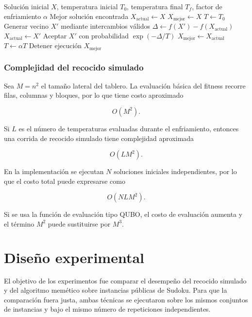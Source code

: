 \documentclass{article}
\begin{document}
\begin{algorithm}[H]
\caption{Recocido simulado}
\begin{algorithmic}[1]
\Require Solución inicial \(X\), temperatura inicial \(T_0\), temperatura final \(T_f\), factor de enfriamiento \(\alpha\)
\Ensure Mejor solución encontrada
\State \(X_{\text{actual}} \gets X\)
\State \(X_{\text{mejor}} \gets X\)
\State \(T \gets T_0\)
    \State Generar vecino \(X'\) mediante intercambios válidos
    \State \(\Delta \gets f(X') - f(X_{\text{actual}})\)
        \State \(X_{\text{actual}} \gets X'\)
    \Else
        \State Aceptar \(X'\) con probabilidad \(\exp(-\Delta/T)\)
    \EndIf
        \State \(X_{\text{mejor}} \gets X_{\text{actual}}\)
    \EndIf
    \State \(T \gets \alpha T\)
        \State Detener ejecución
    \EndIf
\EndWhile
\State \Return \(X_{\text{mejor}}\)
\end{algorithmic}
\end{algorithm}

\subsubsection{Complejidad del recocido simulado}

Sea \(M=n^2\) el tamaño lateral del tablero. La evaluación básica del fitness recorre filas, columnas y bloques, por lo que tiene costo aproximado

\[
O(M^2).
\]

Si \(L\) es el número de temperaturas evaluadas durante el enfriamiento, entonces una corrida de recocido simulado tiene complejidad aproximada

\[
O(LM^2).
\]

En la implementación se ejecutan \(N\) soluciones iniciales independientes, por lo que el costo total puede expresarse como

\[
O(NLM^2).
\]

Si se usa la función de evaluación tipo QUBO, el costo de evaluación aumenta y el término \(M^2\) puede sustituirse por \(M^3\).\\
\uline{\hfill \phantom{-} \hfill}
\section{Diseño experimental}

El objetivo de los experimentos fue comparar el desempeño del recocido simulado y del algoritmo memético sobre instancias públicas de Sudoku. Para que la comparación fuera justa, ambas técnicas se ejecutaron sobre los mismos conjuntos de instancias y bajo el mismo número de repeticiones independientes.
\end{document}
